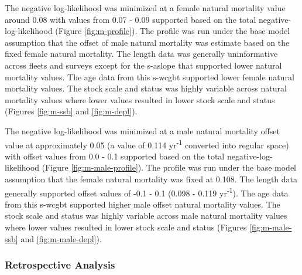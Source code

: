 \documentclass[11pt,
  english,
  a4paper,
]{article}
\begin{document}
\leavevmode\tagmcend\tagstructend\par


The negative log-likelihood was minimized at a female natural mortality value around 0.08 with values from 0.07 - 0.09 supported based on the total negative-log-likelihood (Figure \ref{fig:m-profile}). The profile was run under the base model assumption that the offset of male natural mortality was estimate based on the fixed female natural mortality. The length data was generally uninformative across fleets and surveys except for the \gls{s-aslope} that supported lower natural mortality values. The age data from this \gls{s-wcgbt} supported lower female natural mortality values. The stock scale and status was highly variable across natural mortality values where lower values resulted in lower stock scale and status (Figures \ref{fig:m-ssb} and \ref{fig:m-depl}).

\leavevmode\tagmcend\tagstructend\par


The negative log-likelihood was minimized at a male natural mortality offset value at approximately 0.05 (a value of 0.114 yr\textsuperscript{-1} converted into regular space) with offset values from 0.0 - 0.1 supported based on the total negative-log-likelihood (Figure \ref{fig:m-male-profile}). The profile was run under the base model assumption that the female natural mortality was fixed at 0.108. The length data generally supported offset values of -0.1 - 0.1 (0.098 - 0.119 yr\textsuperscript{-1}). The age data from this \gls{s-wcgbt} supported higher male offset natural mortality values. The stock scale and status was highly variable across male natural mortality values where lower values resulted in lower stock scale and status (Figures \ref{fig:m-male-ssb} and \ref{fig:m-male-depl}).

\leavevmode\tagmcend\tagstructend\par


\hypertarget{retrospective-analysis}{%
\subsubsection{Retrospective Analysis}\label{retrospective-analysis}}

\leavevmode\tagmcend\tagstructend
\end{document}
